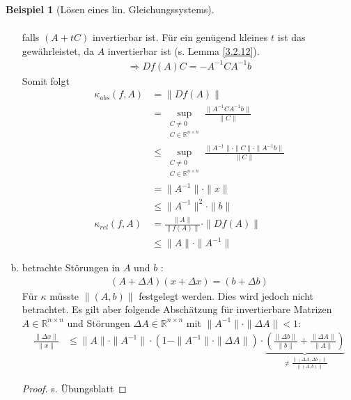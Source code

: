 \documentclass[ngerman,fontsize=11pt, paper=a4, parskip=half, titlepage=true, toc=bib]{scrbook}
\theoremstyle{definition}
\newtheorem{Bsp}[Def]{Beispiel}
\theoremstyle{plain}
\newcommand{\R}{\mathds{R}}
\newcommand{\Renn}{\mathds{R}^{n\times n}}
\newenvironment{Bspe}[1][]{ %
  \begin{Bsp}[#1]
  }
  {
  \end{Bsp}
  \addtocounter{subsection}{1}
}
\begin{document}
\begin{Bspe}[Lösen eines lin. Gleichungssystems]
\begin{enumerate}[a)]
\begin{align*}
    \end{align*}
    falls $(A+tC)$ invertierbar ist. Für ein genügend kleines $t$ ist das gewährleistet, da $A$ invertierbar ist (s. Lemma \ref{3.2.12}).
    \begin{gather*}
      \Rightarrow Df(A) C = -A^{-1}CA^{-1}b
    \end{gather*}
    Somit folgt
    \begin{align}
      \nonumber
      \kappa_{abs} (f,A) &= \|Df(A)\| \\ \nonumber
                         &= \sup_{\substack{
                           C\neq 0 \\ 
      C\in \R^{n\times n}											  	
      }}
      \frac{\|A^{-1}CA^{-1}b\|}{\|C\|} \\ \nonumber
                         &\leq \sup_{\substack{
                           C\neq 0 \\ 
      C \in \R^{n\times n}														  	
      }}
      \frac{\|A^{-1}\|\cdot\|C\|\cdot\|A^{-1}b\|}{\|C\|} \\ \nonumber
                         &= \|A^{-1}\| \cdot\|x\| \\ \nonumber
                         &\leq   \|A^{-1}\|^2 \cdot\|b\| \\ \nonumber
      \kappa_{rel}(f,A)  &= \frac{\|A\|}{\|f(A)\|} \cdot \|Df(A)\| \\
                         &\leq \|A\|\cdot \|A^{-1}\| \label{III.2.10}
    \end{align}
  \item betrachte Störungen in $A$ und $b$ :
    \begin{gather*}
      (A+\Delta A)(x+\Delta x) = (b+\Delta b) 
    \end{gather*}
    Für $\kappa$ müsste $\|(A,b)\|$ festgelegt werden. Dies wird jedoch nicht betrachtet. Es gilt aber folgende Abschätzung für invertierbare Matrizen $A\in \Renn $ und Störungen
    $\Delta A \in \R^{n\times n}$ mit $\|A^{-1}\|\cdot \|\Delta A\| < 1$:
    \begin{align}
      \frac{\|\Delta x\|}{\|x\|} & \leq \|A\| \cdot \|A^{-1}\|\cdot (1- \|A^{-1}\|\cdot \|\Delta A\|) 
                                   \cdot
                                   \underbrace{\left(  \frac{\|\Delta b\|}{\|b\|} +  \frac{\|\Delta A\|}{\|A\|}  \right)}_{\neq  \frac{\|(\Delta A, \Delta b)\|}{\|(A,b)\|} }
                                   \label{III.2.11}
    \end{align}
    \begin{proof} s. Übungsblatt \end{proof}
  \end{enumerate}
\end{Bspe}
\end{document}
